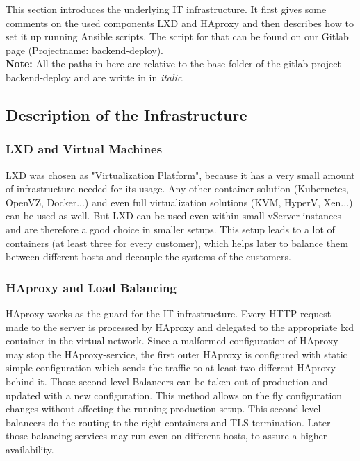 This section introduces the underlying IT infrastructure. It first gives some comments on the used components LXD and HAproxy and then describes how to set it up running Ansible scripts. The script for that can be found on our Gitlab page (Projectname: backend-deploy).\\
\textbf{Note:} All the paths in here are relative to the base folder of the gitlab project backend-deploy and are writte in in \textit{italic}.

\subsection{Description of the Infrastructure}

\subsubsection{LXD and Virtual Machines}

LXD was chosen as "Virtualization Platform", because it has a very small amount of infrastructure needed for its usage. Any other container solution (Kubernetes, OpenVZ, Docker...) and even full virtualization solutions (KVM, HyperV, Xen...) can be used as well.
But LXD can be used even within small vServer instances and are therefore a good choice in smaller setups. This setup leads to a lot of containers (at least three for every customer), which helps later to balance them between different hosts and decouple the systems of the customers.


\subsubsection{HAproxy and Load Balancing}\label{subsubsection:haproxys}
HAproxy works as the guard for the IT infrastructure. Every HTTP request made to the server is processed by HAproxy and delegated to the appropriate lxd container in the virtual network.
Since a malformed configuration of HAproxy may stop the HAproxy-service, the first outer HAproxy is configured with static simple configuration which sends the traffic to at least two different HAproxy behind it. Those second level Balancers can be taken out of production and updated with a new configuration. This method allows on the fly configuration changes without affecting the running production setup.
This second level balancers do the routing to the right containers and TLS termination.
Later those balancing services may run even on different hosts, to assure a higher availability.

